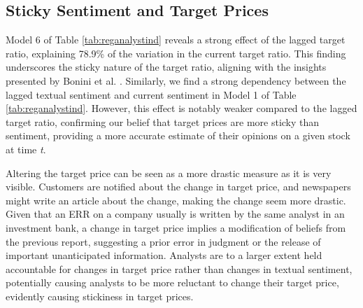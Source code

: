 







\subsection{Sticky Sentiment and Target Prices}


Model 6 of Table \ref{tab:reganalystind} reveals a strong effect of the lagged target ratio, explaining 78.9\% of the variation in the current target ratio. This finding underscores the sticky nature of the target ratio, aligning with the insights presented by Bonini et al. \parencite*{bonini2010target}. Similarly, we find a strong dependency between the lagged textual sentiment and current sentiment in Model 1 of Table \ref{tab:reganalystind}. However, this effect is notably weaker compared to the lagged target ratio, confirming our belief that target prices are more sticky than sentiment, providing a more accurate estimate of their opinions on a given stock at time \textit{t}. 

Altering the target price can be seen as a more drastic measure as it is very visible. Customers are notified about the change in target price, and newspapers might write an article about the change, making the change seem more drastic. Given that an ERR on a company usually is written by the same analyst in an investment bank, a change in target price implies a modification of beliefs from the previous report, suggesting a prior error in judgment or the release of important unanticipated information. Analysts are to a larger extent held accountable for changes in target price rather than changes in textual sentiment, potentially causing analysts to be more reluctant to change their target price, evidently causing stickiness in target prices. 

